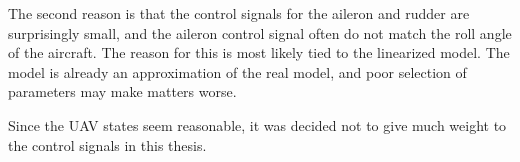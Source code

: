 The second reason is that the control signals for the aileron and rudder are surprisingly small, and the aileron control signal often do not match the roll angle of the aircraft. The reason for this is most likely tied to the linearized model. The model is already an approximation of the real model, and poor selection of parameters may make matters worse.

Since the UAV states seem reasonable, it was decided not to give much weight to the control signals in this thesis. %